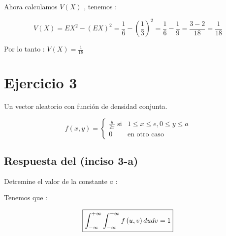 \documentclass[12pt]{article}
\begin{document}
    \begin{flushleft}
        Ahora calculamos $V(X)$  , tenemos :
    \end{flushleft}
       
    \begin{equation*}
        \displaystyle V(X) = EX^2 - (EX)^2 = \frac{1}{6}-\left(\frac{1}{3}\right)^2= \frac{1}{6} - \frac{1}{9} = \frac{3-2}{18} = \frac{1}{18}
    \end{equation*}
        
    \begin{flushleft}
        Por lo tanto : $\displaystyle V(X) = \frac{1}{18}$
    \end{flushleft} 
        

    \section*{Ejercicio 3}
    
    \begin{flushleft}
        Un vector aleatorio con funci\'on de densidad conjunta.
    \end{flushleft}
   
    \begin{equation*} 
        f\left(x,y\right) = \begin{cases} 
        \mbox{$\displaystyle\frac{y}{2x} $ si} & 1\leq x\leq e, 0\leq y \leq a  
        \\
        0  & \mbox{en otro caso }
        \end{cases}
    \end{equation*}


    \subsection*{Respuesta del (inciso 3-a)}
    
    \begin{flushleft}
        Detremine el valor de la constante $a$ :
    \end{flushleft}
    
    \begin{flushleft}
        Tenemos que :
    \end{flushleft}
    
    \begin{equation*}
        \fbox{$
            \displaystyle\int_{-\infty}^{+\infty}\int_{-\infty}^{+\infty}f\left(u,v\right)dudv = 1
        $}
    \end{equation*}
    
\end{document}
